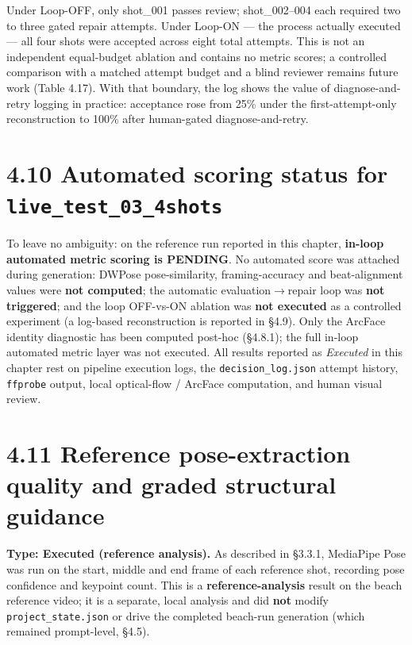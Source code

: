 \documentclass[10pt,twocolumn,letterpaper]{article}
\begin{document}
Under Loop-OFF, only shot\_001 passes review; shot\_002--004 each required two to three gated repair attempts. Under Loop-ON --- the process actually executed --- all four shots were accepted across eight total attempts. This is not an independent equal-budget ablation and contains no metric scores; a controlled comparison with a matched attempt budget and a blind reviewer remains future work (Table 4.17). With that boundary, the log shows the value of diagnose-and-retry logging in practice: acceptance rose from 25\% under the first-attempt-only reconstruction to 100\% after human-gated diagnose-and-retry.


\section*{4.10 Automated scoring status for \texttt{live\_test\_03\_4shots}}

To leave no ambiguity: on the reference run reported in this chapter, \textbf{in-loop automated metric scoring is PENDING}. No automated score was attached during generation: DWPose pose-similarity, framing-accuracy and beat-alignment values were \textbf{not computed}; the automatic evaluation$\rightarrow$repair loop was \textbf{not triggered}; and the loop OFF-vs-ON ablation was \textbf{not executed} as a controlled experiment (a log-based reconstruction is reported in \S{}4.9). Only the ArcFace identity diagnostic has been computed post-hoc (\S{}4.8.1); the full in-loop automated metric layer was not executed. All results reported as \emph{Executed} in this chapter rest on pipeline execution logs, the \texttt{decision\_log.json} attempt history, \texttt{ffprobe} output, local optical-flow / ArcFace computation, and human visual review.


\section*{4.11 Reference pose-extraction quality and graded structural guidance}

\textbf{Type: Executed (reference analysis).} As described in \S{}3.3.1, MediaPipe Pose was run on the start, middle and end frame of each reference shot, recording pose confidence and keypoint count. This is a \textbf{reference-analysis} result on the beach reference video; it is a separate, local analysis and did \textbf{not} modify \texttt{project\_state.json} or drive the completed beach-run generation (which remained prompt-level, \S{}4.5).
\end{document}
